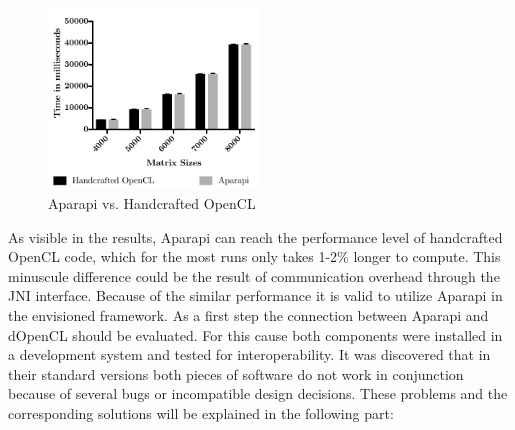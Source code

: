 \begin{figure}[H]
	\includegraphics[width=0.5\textwidth]{images/aparapivsopencl.pdf}
	\centering
	\caption{Aparapi vs. Handcrafted OpenCL}
	\label{img:aparapi_vs_opencl}
\end{figure}

As visible in the results, Aparapi can reach the performance level of handcrafted OpenCL code, which for the most runs only takes 1-2\% longer to compute. This minuscule difference could be the result of communication overhead through the JNI interface. Because of the similar performance it is valid to utilize Aparapi in the envisioned framework. As a first step the connection between Aparapi and dOpenCL should be evaluated. For this cause both components were installed in a development system and tested for interoperability. It was discovered that in their standard versions both pieces of software do not work in conjunction because of several bugs or incompatible design decisions. These problems and the corresponding solutions will be explained in the following part:

